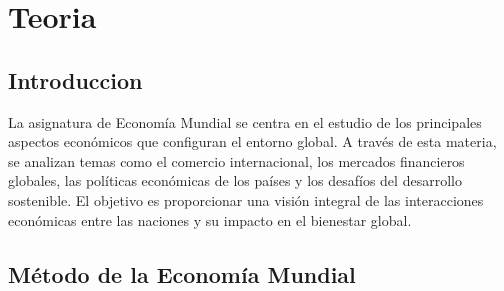 \documentclass[12pt]{book} %
\begin{document}
\newpage
\thispagestyle{empty}
\mbox{}

\newpage
\thispagestyle{empty}
\mbox{}






\tableofcontents
\clearpage
\thispagestyle{empty} %

%
%

\part{Teoria}

\hypertarget{introduccion}{%
\chapter{Introduccion}\label{introduccion}}

La asignatura de Economía Mundial se centra en el estudio de los
principales aspectos económicos que configuran el entorno global. A
través de esta materia, se analizan temas como el comercio
internacional, los mercados financieros globales, las políticas
económicas de los países y los desafíos del desarrollo sostenible. El
objetivo es proporcionar una visión integral de las interacciones
económicas entre las naciones y su impacto en el bienestar global.

\hypertarget{economuxeda-mundial-muxe9todo}{%
\chapter{Método de la Economía Mundial}\label{economuxeda-mundial-muxe9todo}}
\end{document}
